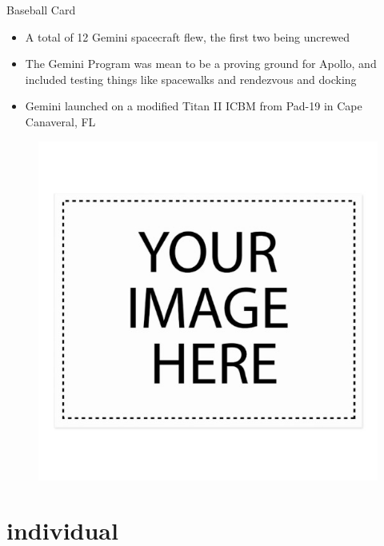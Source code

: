 \documentclass[10pt]{beamer}
\begin{document}
	\begin{frame}{Baseball Card}
	\begin{minipage}{0.49\textwidth}
\begin{itemize}
	\item A total of 12 Gemini spacecraft flew, the first two being uncrewed
	\item The Gemini Program was mean to be a proving ground for Apollo, and included testing things like spacewalks and rendezvous and docking
	\item Gemini launched on a modified Titan II ICBM from Pad-19 in Cape Canaveral, FL
\end{itemize}
	\end{minipage}%
\begin{minipage}{0.49\textwidth}
	\begin{figure}
		\centering
		\includegraphics[width=\textwidth]{Group_Beauty.png}
	\end{figure}
	
\end{minipage}

\end{frame}

\section{individual}
\end{document}
